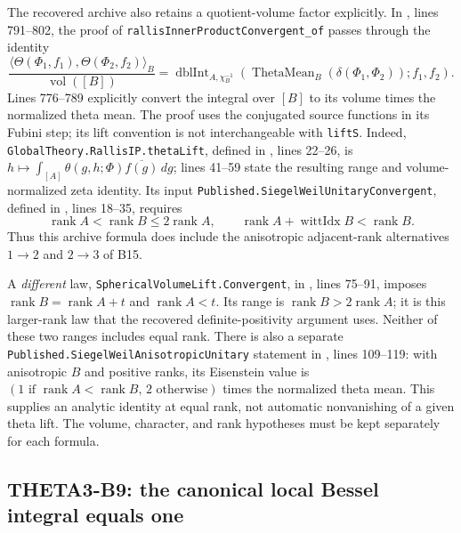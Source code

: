 \documentclass[11pt]{article}
\theoremstyle{definition}\newtheorem{definition}[theorem]{Definition}\newtheorem{remark}[theorem]{Remark}
\begin{document}
The recovered archive also retains a quotient-volume factor explicitly. In
, lines 791--802, the proof of \nolinkurl{rallisInnerProductConvergent_of} passes through the identity
\[
 \frac{\langle\Theta(\Phi_1,f_1),\Theta(\Phi_2,f_2)\rangle_B}
      {\operatorname{vol}([B])}
 =\operatorname{dblInt}_{A,\chi_B^{-1}}
       (\operatorname{ThetaMean}_B(\delta(\Phi_1,\Phi_2));f_1,f_2).
\]
Lines 776--789 explicitly convert the integral over $[B]$ to its volume times the normalized theta mean. The proof uses the conjugated source functions in its Fubini step; its lift convention is not interchangeable with \texttt{liftS}. Indeed, \nolinkurl{GlobalTheory.RallisIP.thetaLift}, defined in , lines 22--26, is $h\mapsto\int_{[A]}\theta(g,h;\Phi)\overline{f(g)}\,dg$; lines 41--59 state the resulting range and volume-normalized zeta identity. Its input \nolinkurl{Published.SiegelWeilUnitaryConvergent}, defined in , lines 18--35, requires
\[
 \operatorname{rank}A<\operatorname{rank}B\leq2\operatorname{rank}A,
 \qquad \operatorname{rank}A+\operatorname{wittIdx}B<\operatorname{rank}B.
\]
Thus this archive formula does include the anisotropic adjacent-rank alternatives $1\to2$ and $2\to3$ of B15.

A \emph{different} law, \nolinkurl{SphericalVolumeLift.Convergent}, in , lines 75--91, imposes $\operatorname{rank}B=\operatorname{rank}A+t$ and $\operatorname{rank}A<t$. Its range is $\operatorname{rank}B>2\operatorname{rank}A$; it is this larger-rank law that the recovered definite-positivity argument uses. Neither of these two ranges includes equal rank. There is also a separate \nolinkurl{Published.SiegelWeilAnisotropicUnitary} statement in , lines 109--119: with anisotropic $B$ and positive ranks, its Eisenstein value is $(1\text{ if }\operatorname{rank}A<\operatorname{rank}B,\,2\text{ otherwise})$ times the normalized theta mean. This supplies an analytic identity at equal rank, not automatic nonvanishing of a given theta lift. The volume, character, and rank hypotheses must be kept separately for each formula.

\subsection{THETA3-B9: the canonical local Bessel integral equals one}\label{B9}
\end{document}
